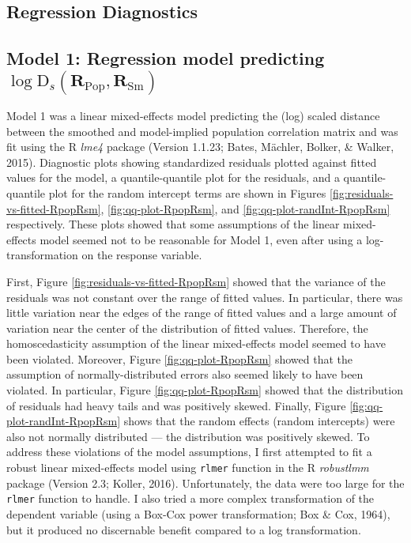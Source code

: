 \documentclass[
  english,
  man]{apa6}
\begin{document}
\begin{appendix}
\hypertarget{regression-diagnostics}{%
\section{Regression Diagnostics}\label{regression-diagnostics}}

\hypertarget{model-1-regression-model-predicting-log-textrmd_smathbfr_textrmpop-mathbfr_textrmsm}{%
\subsection{\texorpdfstring{Model 1: Regression model predicting
\(\log \textrm{D}_s(\mathbf{R}_{\textrm{Pop}}, \mathbf{R}_{\textrm{Sm}})\)}{Model 1: Regression model predicting \textbackslash log \textbackslash textrm\{D\}\_s(\textbackslash mathbf\{R\}\_\{\textbackslash textrm\{Pop\}\}, \textbackslash mathbf\{R\}\_\{\textbackslash textrm\{Sm\}\})}}\label{model-1-regression-model-predicting-log-textrmd_smathbfr_textrmpop-mathbfr_textrmsm}}

Model 1 was a linear mixed-effects model predicting the (log) scaled
distance between the smoothed and model-implied population correlation
matrix and was fit using the R \emph{lme4} package (Version 1.1.23;
Bates, Mächler, Bolker, \& Walker, 2015). Diagnostic plots showing
standardized residuals plotted against fitted values for the model, a
quantile-quantile plot for the residuals, and a quantile-quantile plot
for the random intercept terms are shown in Figures
\ref{fig:residuals-vs-fitted-RpopRsm}, \ref{fig:qq-plot-RpopRsm}, and
\ref{fig:qq-plot-randInt-RpopRsm} respectively. These plots showed that
some assumptions of the linear mixed-effects model seemed not to be
reasonable for Model 1, even after using a log-transformation on the
response variable.

First, Figure \ref{fig:residuals-vs-fitted-RpopRsm} showed that the
variance of the residuals was not constant over the range of fitted
values. In particular, there was little variation near the edges of the
range of fitted values and a large amount of variation near the center
of the distribution of fitted values. Therefore, the homoscedasticity
assumption of the linear mixed-effects model seemed to have been
violated. Moreover, Figure \ref{fig:qq-plot-RpopRsm} showed that the
assumption of normally-distributed errors also seemed likely to have
been violated. In particular, Figure \ref{fig:qq-plot-RpopRsm} showed
that the distribution of residuals had heavy tails and was positively
skewed. Finally, Figure \ref{fig:qq-plot-randInt-RpopRsm} shows that the
random effects (random intercepts) were also not normally distributed
--- the distribution was positively skewed. To address these violations
of the model assumptions, I first attempted to fit a robust linear
mixed-effects model using \texttt{rlmer} function in the R
\emph{robustlmm} package (Version 2.3; Koller, 2016). Unfortunately, the
data were too large for the \texttt{rlmer} function to handle. I also
tried a more complex transformation of the dependent variable (using a
Box-Cox power transformation; Box \& Cox, 1964), but it produced no
discernable benefit compared to a log transformation.


\end{appendix}
\end{document}
